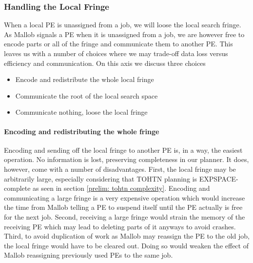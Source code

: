 \subsubsection{Handling the Local Fringe}
When a local PE is unassigned from a job, we will loose the local search fringe. As Mallob signals a PE when it is unassigned from a job, we are however free to encode parts or all of the fringe and communicate them to another PE. This leaves us with a number of choices where we may trade-off data loss versus efficiency and communication. On this axis we discuss three choices
\begin{itemize}
	\item Encode and redistribute the whole local fringe
	\item Communicate the root of the local search space
	\item Communicate nothing, loose the local fringe
\end{itemize}

\paragraph{Encoding and redistributing the whole fringe}
Encoding and sending off the local fringe to another PE is, in a way, the easiest operation. No information is lost, preserving completeness in our planner. It does, however, come with a number of disadvantages. First, the local fringe may be arbitrarily large, especially considering that TOHTN planning is EXPSPACE-complete as seen in section \ref{prelim: tohtn complexity}. Encoding and communicating a large fringe is a very expensive operation which would increase the time from Mallob telling a PE to suspend itself until the PE actually is free for the next job. Second, receiving a large fringe would strain the memory of the receiving PE which may lead to deleting parts of it anyways to avoid crashes. Third, to avoid duplication of work as Mallob may reassign the PE to the old job, the local fringe would have to be cleared out. Doing so would weaken the effect of Mallob reassigning previously used PEs to the same job.
\begin{comment}
- the most complete operation
- nothing is lost
- nodes higher up in the tree of PEs may be more strained now (depending on the communication pattern)
- a very expensive operation
- take care to delete the local fringe to avoid duplication!
\end{comment}

